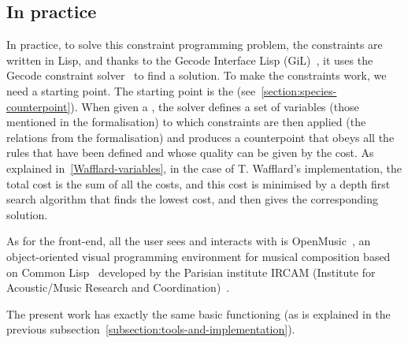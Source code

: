  \subsection{In practice}
 In practice, to solve this constraint programming problem, the constraints are written in Lisp, and thanks to the Gecode Interface Lisp (GiL)~\cite{GiL}, it uses the Gecode constraint solver~\cite{Gecode} to find a solution. To make the constraints work, we need a starting point. The starting point is the \cf (see~\ref{section:species-counterpoint}).
 When given a \cf, the solver defines a set of variables (those mentioned in the formalisation) to which constraints are then applied (the relations from the formalisation) and produces a counterpoint that obeys all the rules that have been defined and whose quality can be given by the cost. As explained in~\ref{Wafflard-variables}, in the case of T. Wafflard's implementation, the total cost is the sum of all the costs, and this cost is minimised by a depth first search algorithm that finds the lowest cost, and then gives the corresponding solution.
 
 
 As for the front-end, all the user sees and interacts with is OpenMusic~\cite{OpenMusic}, an object-oriented visual programming environment for musical composition based on Common Lisp~\cite{commonlisp} developed by the Parisian institute IRCAM (Institute for Acoustic/Music Research and Coordination)~\cite{IRCAM}.
 
 The present work has exactly the same basic functioning (as is explained in the previous subsection~\ref{subsection:tools-and-implementation}). 



